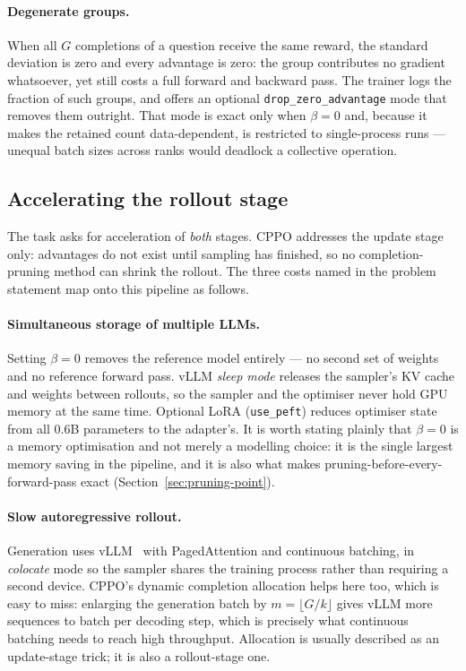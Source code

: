 \documentclass[11pt,a4paper]{article}
\begin{document}
\paragraph{Degenerate groups.} When all $G$ completions of a question receive
the same reward, the standard deviation is zero and every advantage is zero:
the group contributes no gradient whatsoever, yet still costs a full forward
and backward pass. The trainer logs the fraction of such groups, and offers an
optional \texttt{drop\_zero\_advantage} mode that removes them outright. That
mode is exact only when $\beta = 0$ and, because it makes the retained count
data-dependent, is restricted to single-process runs --- unequal batch sizes
across ranks would deadlock a collective operation.


\subsection{Accelerating the rollout stage}
\label{sec:rollout}

The task asks for acceleration of \emph{both} stages. CPPO addresses the
update stage only: advantages do not exist until sampling has finished, so no
completion-pruning method can shrink the rollout. The three costs named in the
problem statement map onto this pipeline as follows.

\paragraph{Simultaneous storage of multiple LLMs.} Setting $\beta = 0$ removes
the reference model entirely --- no second set of weights and no reference
forward pass. vLLM \emph{sleep mode} releases the sampler's KV cache and
weights between rollouts, so the sampler and the optimiser never hold GPU
memory at the same time. Optional LoRA (\texttt{use\_peft}) reduces optimiser
state from all $0.6$B parameters to the adapter's. It is worth stating plainly
that $\beta = 0$ is a memory optimisation and not merely a modelling choice:
it is the single largest memory saving in the pipeline, and it is also what
makes pruning-before-every-forward-pass exact (Section~\ref{sec:pruning-point}).

\paragraph{Slow autoregressive rollout.} Generation uses
vLLM~\cite{kwon2023vllm} with PagedAttention and continuous batching, in
\emph{colocate} mode so the sampler shares the training process rather than
requiring a second device. CPPO's dynamic completion allocation helps here
too, which is easy to miss: enlarging the generation batch by
$m = \lfloor G/k \rfloor$ gives vLLM more sequences to batch per decoding
step, which is precisely what continuous batching needs to reach high
throughput. Allocation is usually described as an update-stage trick; it is
also a rollout-stage one.
\end{document}
